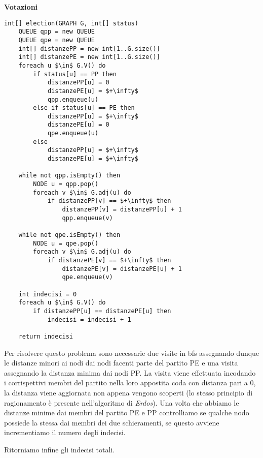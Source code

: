 \documentclass[../cheatSheetAlgoritmi.tex]{subfiles}
\begin{document}
\textbf{Votazioni}
\begin{lstlisting}[caption=Le votazioni]
int[] election(GRAPH G, int[] status)
	QUEUE qpp = new QUEUE
  	QUEUE qpe = new QUEUE
  	int[] distanzePP = new int[1..G.size()]
  	int[] distanzePE = new int[1..G.size()]
  	foreach u $\in$ G.V() do
    	if status[u] == PP then
      		distanzePP[u] = 0
      		distanzePE[u] = $+\infty$
      		qpp.enqueue(u)
    	else if status[u] == PE then
      		distanzePP[u] = $+\infty$
      		distanzePE[u] = 0
      		qpe.enqueue(u)
    	else
      		distanzePP[u] = $+\infty$
      		distanzePE[u] = $+\infty$

  	while not qpp.isEmpty() then
    	NODE u = qpp.pop()
    	foreach v $\in$ G.adj(u) do
      		if distanzePP[v] == $+\infty$ then
        		distanzePP[v] = distanzePP[u] + 1
        		qpp.enqueue(v)
  
  	while not qpe.isEmpty() then
    	NODE u = qpe.pop()
    	foreach v $\in$ G.adj(u) do
      		if distanzePE[v] == $+\infty$ then
        		distanzePE[v] = distanzePE[u] + 1
        		qpe.enqueue(v)
  
  	int indecisi = 0
  	foreach u $\in$ G.V() do
    	if distanzePP[u] == distanzePE[u] then
      		indecisi = indecisi + 1
  
  	return indecisi
\end{lstlisting}
Per risolvere questo problema sono necessarie due visite in bfs assegnando dunque le distanze minori ai nodi dai nodi facenti parte del partito PE e una visita assegnando la distanza minima dai nodi PP. La visita viene effettuata incodando i corrispettivi membri del partito nella loro appostita coda con distanza pari a 0, la distanza viene aggiornata non appena vengono scoperti (lo stesso principio di ragionamento è presente nell'algoritmo di \textit{Erdos}). Una volta che abbiamo le distanze minime dai membri del partito PE e PP controlliamo se qualche nodo possiede la stessa dai membri dei due schieramenti, se questo avviene incrementiamo il numero degli indecisi.

Ritorniamo infine gli indecisi totali.
\end{document}
